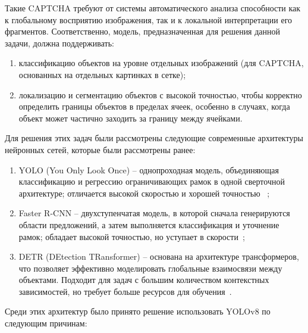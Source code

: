 Такие CAPTCHA требуют от системы автоматического анализа способности как к 
глобальному восприятию изображения, так и к локальной интерпретации его 
фрагментов. Соответственно, модель, предназначенная для решения данной задачи, 
должна поддерживать:

\begin{enumerate}
    \item классификацию объектов на уровне отдельных изображений (для CAPTCHA, 
    основанных на отдельных картинках в сетке);
    \item локализацию и сегментацию объектов с высокой точностью, чтобы 
    корректно определить границы объектов в пределах ячеек, особенно в случаях, 
    когда объект может частично заходить за границу между ячейками.
\end{enumerate}

Для решения этих задач были рассмотрены следующие современные архитектуры 
нейронных сетей, которые были рассмотрены ранее:

\begin{enumerate}
    \item YOLO (You Only Look Once) -- однопроходная модель, объединяющая 
    классификацию и регрессию ограничивающих рамок в одной сверточной 
    архитектуре; отличается высокой скоростью и хорошей точностью~
    \cite{redmon2016yolov2, UltralyticsYOLOv8};
    \item Faster R-CNN -- двухступенчатая модель, в которой сначала генерируются 
    области предложений, а затем выполняется классификация и уточнение рамок; 
    обладает высокой точностью, но уступает в скорости~\cite{ren2015fasterrcnn};
    \item DETR (DEtection TRansformer) -- основана на архитектуре трансформеров, 
    что позволяет эффективно моделировать глобальные взаимосвязи между объектами. 
    Подходит для задач с большим количеством контекстных зависимостей, но требует 
    больше ресурсов для обучения~\cite{carion2020detr}.
\end{enumerate}

Среди этих архитектур было принято решение использовать YOLOv8 по следующим 
причинам:

